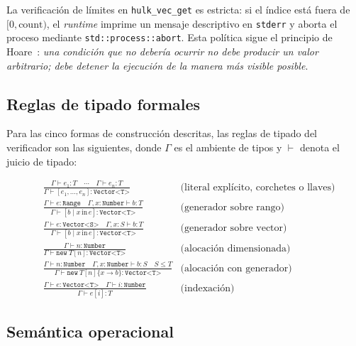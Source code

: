 \documentclass[11pt,a4paper,oneside,openany]{report}
\newcommand{\code}[1]{\texttt{#1}}
\begin{document}
La verificación de límites en \code{hulk\_vec\_get} es estricta: si el
índice está fuera de $[0, \text{count})$, el \textit{runtime} imprime un
mensaje descriptivo en \code{stderr} y aborta el proceso mediante
\code{std::process::abort}. Esta política sigue el principio de
Hoare~\cite{hoare1985}: \emph{una condición que no debería ocurrir no debe
producir un valor arbitrario; debe detener la ejecución de la manera más
visible posible}.

\subsection{Reglas de tipado formales}

Para las cinco formas de construcción descritas, las reglas de tipado del
verificador son las siguientes, donde $\Gamma$ es el ambiente de tipos y
$\vdash$ denota el juicio de tipado:

\begin{align*}
  & \frac{\Gamma \vdash e_1 : T \quad \cdots \quad \Gamma \vdash e_n : T}
         {\Gamma \vdash [e_1, \ldots, e_n] : \code{Vector<T>}}
    & \text{(literal explícito, corchetes o llaves)} \\[6pt]
  & \frac{\Gamma \vdash e : \code{Range} \quad
          \Gamma, x : \code{Number} \vdash b : T}
         {\Gamma \vdash [b \mid x \,\text{in}\, e] : \code{Vector<T>}}
    & \text{(generador sobre rango)} \\[6pt]
  & \frac{\Gamma \vdash e : \code{Vector<S>} \quad
          \Gamma, x : S \vdash b : T}
         {\Gamma \vdash [b \mid x \,\text{in}\, e] : \code{Vector<T>}}
    & \text{(generador sobre vector)} \\[6pt]
  & \frac{\Gamma \vdash n : \code{Number}}
         {\Gamma \vdash \texttt{new}\ T[n] : \code{Vector<T>}}
    & \text{(alocación dimensionada)} \\[6pt]
  & \frac{\Gamma \vdash n : \code{Number} \quad
          \Gamma, x : \code{Number} \vdash b : S \quad S \leq T}
         {\Gamma \vdash \texttt{new}\ T[n]\{x \rightarrow b\} : \code{Vector<T>}}
    & \text{(alocación con generador)} \\[6pt]
  & \frac{\Gamma \vdash e : \code{Vector<T>} \quad
          \Gamma \vdash i : \code{Number}}
         {\Gamma \vdash e[i] : T}
    & \text{(indexación)}
\end{align*}

\subsection{Semántica operacional}
\end{document}
